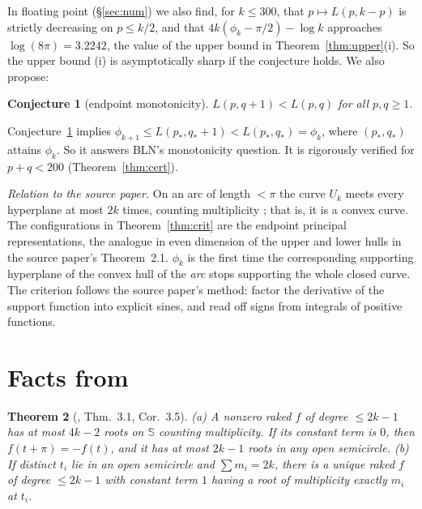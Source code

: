 \documentclass[11pt]{amsart}
\newtheorem{theorem}{Theorem}
\newtheorem{conjecture}[theorem]{Conjecture}
\theoremstyle{definition}
\newcommand{\Sph}{\mathbb{S}}
\begin{document}
In floating point (\S\ref{sec:num}) we also find, for $k\le300$, that $p\mapsto L(p,k-p)$ is strictly decreasing on $p\le k/2$, and that
$4k(\phi_k-\pi/2)-\log k$ approaches $\log(8\pi)=3.2242$, the value of the upper bound in Theorem~\ref{thm:upper}(i).
So the upper bound (i) is asymptotically sharp if the conjecture holds. We also propose:

\begin{conjecture}[endpoint monotonicity]\label{conj:EM}
$L(p,q+1)<L(p,q)$ for all $p,q\ge1$.
\end{conjecture}

Conjecture~\ref{conj:EM} implies $\phi_{k+1}\le L(p_*,q_*+1)<L(p_*,q_*)=\phi_k$, where $(p_*,q_*)$ attains $\phi_k$. So it answers BLN's
monotonicity question. It is rigorously verified for $p+q<200$ (Theorem~\ref{thm:cert}).

\medskip\noindent\emph{Relation to the source paper.} On an arc of length $<\pi$ the curve $U_k$ meets every hyperplane at most $2k$
times, counting multiplicity \cite[Thm.~3.1]{BLN}; that is, it is a convex curve. The configurations in Theorem~\ref{thm:crit} are the
endpoint principal representations, the analogue in even dimension of the upper and lower hulls in the source paper's Theorem~2.1.
$\phi_k$ is the first time the corresponding supporting hyperplane of the convex hull of the \emph{arc} stops supporting the whole
closed curve. The criterion follows the source paper's method: factor the derivative of the support function into explicit sines, and
read off signs from integrals of positive functions.

\section{Facts from \cite{BLN}}

\begin{theorem}[\cite{BLN}, Thm.~3.1, Cor.~3.5]\label{thm:roots}
(a) A nonzero raked $f$ of degree $\le2k-1$ has at most $4k-2$ roots on $\Sph$ counting multiplicity. If its constant term is $0$, then
$f(t+\pi)=-f(t)$, and it has at most $2k-1$ roots in any open semicircle.
(b) If distinct $t_i$ lie in an open semicircle and $\sum m_i=2k$, there is a unique raked $f$ of degree $\le2k-1$ with constant term $1$
having a root of multiplicity exactly $m_i$ at $t_i$.
\end{theorem}
\end{document}
